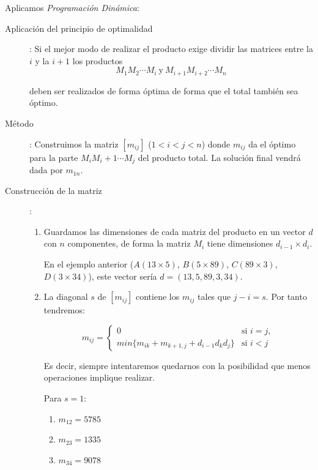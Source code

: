 \documentclass[10pt,a4paper,spanish]{report}
\theoremstyle{definition}
\theoremstyle{remark}
\begin{document}
Aplicamos \textit{\textcolor{amethyst}{Programación Dinámica}}:

\begin{description}
    \item[Aplicación del principio de optimalidad]: Si el mejor modo de realizar el producto exige dividir las matrices entre la $i$ y la $i+1$ los productos
    \begin{displaymath}
        M_1 M_2 \cdots M_i ~ \textrm{y} ~ M_{i+1} M_{i+2} \cdots M_n
    \end{displaymath}

    deben ser realizados de forma óptima de forma que el total también sea óptimo.

    \item[Método]: Construimos la matriz $[m_{ij}]$ ($1 < i < j < n$) donde $m_{ij}$ da el óptimo para la parte $M_i M_i+1 \cdots M_j$ del producto total. La solución final vendrá dada por $m_{1n}$.

    \item[Construcción de la matriz]:
    \begin{enumerate}[\color{amethyst}{$\heartsuit$}]
        \item Guardamos las dimensiones de cada matriz del producto en un vector $d$ con $n$ componentes, de forma la matriz $M_i$ tiene dimensiones $d_{i-1} \times d_i$. 

        En el ejemplo anterior ($A(13 \times 5)$, $B(5 \times 89)$, $C(89 \times 3)$, $D(3 \times 34)$), este vector sería $d = (13,5,89,3,34)$.

        \item La diagonal $s$ de $[m_{ij}]$ contiene los $m_{ij}$ tales que $j-i=s$. Por tanto tendremos:

        \begin{equation*}
        m_{ij} = 
        \begin{cases}
        0 & \text{si } i = j,\\
        min\{m_{ik} + m_{k+1, j} + d_{i-1} d_k d_j\} & \text{si } i < j
        \end{cases} 
        \end{equation*}

        Es decir, siempre intentaremos quedarnos con la posibilidad que menos operaciones implique realizar.

        Para $s=1$:
        \begin{enumerate}[$\longrightarrow$]
            \item $m_{12} = 5785$
            \item $m_{23} = 1335$
            \item $m_{34} = 9078$
        \end{enumerate}


\end{enumerate}
\end{description}
\end{document}
